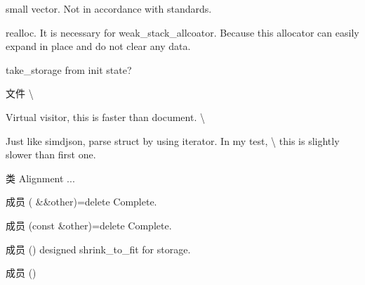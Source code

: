 \begin{DoxyRefList}
\begin{DoxyEnumerate}
\item small vector. Not in accordance with standards.
\item realloc. It is necessary for weak\+\_\+stack\+\_\+allcoator. Because this allocator can easily expand in place and do not clear any data.
\item take\+\_\+storage from init state? 
\end{DoxyEnumerate}
\item[文件 \doxylink{visitor_8hpp}{visitor.hpp} ]\label{todo__todo000032}%
%
\textbackslash{}
\begin{DoxyEnumerate}
\item Virtual visitor, this is faster than document. \textbackslash{}
\item Just like simdjson, parse struct by using iterator. In my test, \textbackslash{} this is slightly slower than first one.  
\end{DoxyEnumerate}
\item[类 \doxylink{classwjr_1_1arena}{wjr\+::arena} ]\label{todo__todo000041}%
%
Alignment ...  
\item[成员 \doxylink{classwjr_1_1basic__ring__buffer_a2c7edcb3a3031c5061db30c02fbe2ba7}{wjr\+::basic\+\_\+ring\+\_\+buffer\texorpdfstring{$<$}{<} Storage \texorpdfstring{$>$}{>}\+::operator=} (\doxylink{classwjr_1_1basic__ring__buffer}{basic\+\_\+ring\+\_\+buffer} \&\&other)=delete]\label{todo__todo000019}%
%
Complete.  
\item[成员 \doxylink{classwjr_1_1basic__ring__buffer_a53e05f2b30dbf931ff0a252d1e595830}{wjr\+::basic\+\_\+ring\+\_\+buffer\texorpdfstring{$<$}{<} Storage \texorpdfstring{$>$}{>}\+::operator=} (const \doxylink{classwjr_1_1basic__ring__buffer}{basic\+\_\+ring\+\_\+buffer} \&other)=delete]\label{todo__todo000018}%
%
Complete.  
\item[成员 \doxylink{classwjr_1_1basic__ring__buffer_a23be4831616b6a9e773830541a17b457}{wjr\+::basic\+\_\+ring\+\_\+buffer\texorpdfstring{$<$}{<} Storage \texorpdfstring{$>$}{>}\+::shrink\+\_\+to\+\_\+fit} ()]\label{todo__todo000020}%
%
designed shrink\+\_\+to\+\_\+fit for storage.  
\item[成员 \doxylink{classwjr_1_1basic__vector_a1b7729c372074f1c7a1a386a5d285b5b}{wjr\+::basic\+\_\+vector\texorpdfstring{$<$}{<} Storage \texorpdfstring{$>$}{>}\+::shrink\+\_\+to\+\_\+fit} ()]\label{todo__todo000023}%

\end{DoxyRefList}
